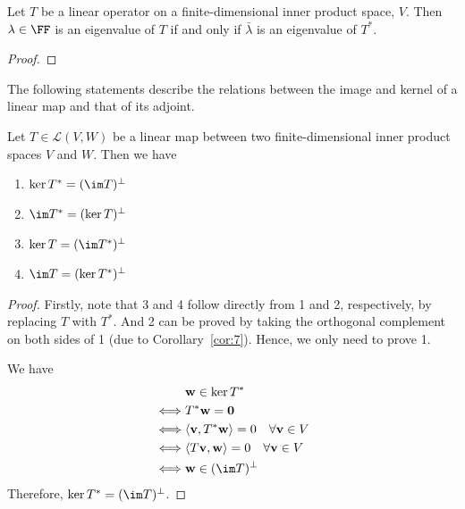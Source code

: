 \documentclass[thmcnt=section, color=blue, 12pt]{my-elegantbook}
\begin{document}

\begin{proposition} \label{pro:11}
	Let $T$ be a linear operator on a 
	finite-dimensional inner product space, $V$.
	Then $\lambda \in \FF$ is an eigenvalue of $T$
	if and only if $\bar{\lambda}$ 
	is an eigenvalue of $T^\ast$.
\end{proposition}

\begin{proof}
\end{proof}


The following statements describe
the relations between the image and kernel of a linear map
and that of its adjoint.

\begin{proposition} \label{pro:7}
	Let $T \in \mathcal{L}(V, W)$ be a linear map 
	between two finite-dimensional inner product spaces $V$ and $W$.
	Then we have
	\begin{enumerate}
		\item $\ker T^\ast = (\im T)^\perp$
		\item $\im T^\ast = (\ker T)^\perp$
		\item $\ker T = (\im T^\ast)^\perp$
		\item $\im T = (\ker T^\ast)^\perp$
	\end{enumerate}
\end{proposition}

\begin{proof}
	Firstly, note that 3 and 4 follow directly from 1 and 2, respectively, 
	by replacing $T$ with $T^\ast$.
	And 2 can be proved by taking the orthogonal complement 
	on both sides of 1 (due to Corollary~\ref{cor:7}).
	Hence, we only need to prove 1.

	We have 
	\begin{align*}
		& \mathbf{w} \in \ker T^\ast \\
		\iff& T^\ast \mathbf{w} = \mathbf{0} \\
		\iff& \langle \mathbf{v}, T^\ast \mathbf{w} \rangle = 0
		\quad \forall \mathbf{v} \in V \\
		\iff& \langle T \mathbf{v}, \mathbf{w} \rangle = 0
		\quad \forall \mathbf{v} \in V \\
		\iff& \mathbf{w} \in (\im T)^\perp
	\end{align*}
	Therefore, $\ker T^\ast = (\im T)^\perp$.
\end{proof}
\end{document}
